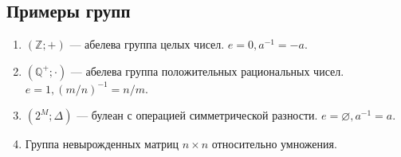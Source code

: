 \subsection*{Примеры групп}
\begin{enumerate}
    \item $(\mathbb{Z}; +)$ — абелева группа целых чисел. $e=0, a^{-1}=-a$.
    \item $(\mathbb{Q}^+; \cdot)$ — абелева группа положительных рациональных чисел. $e=1, (m/n)^{-1} = n/m$.
    \item $(2^M; \Delta)$ — булеан с операцией симметрической разности. $e=\varnothing, a^{-1}=a$.
    \item Группа невырожденных матриц $n \times n$ относительно умножения.
\end{enumerate}